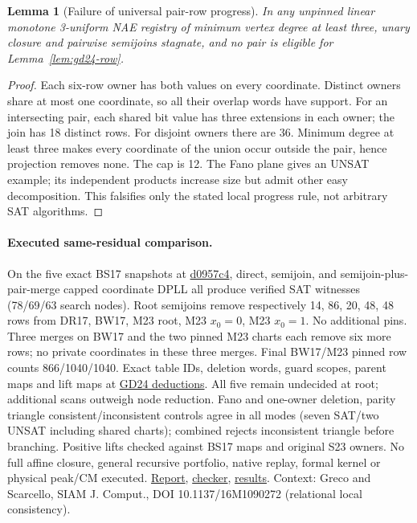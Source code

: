 \documentclass[11pt]{article}
\newtheorem{lemma}[theorem]{Lemma}
\begin{document}
\begin{lemma}[Failure of universal pair-row progress]\label{lem:gd24-stall}
In any unpinned linear monotone 3-uniform NAE registry of minimum vertex degree at least three, unary closure and pairwise semijoins stagnate, and no pair is eligible for Lemma~\ref{lem:gd24-row}.
\end{lemma}
\begin{proof}
Each six-row owner has both values on every coordinate. Distinct owners share at most one coordinate, so all their overlap words have support. For an intersecting pair, each shared bit value has three extensions in each owner; the join has 18 distinct rows. For disjoint owners there are 36. Minimum degree at least three makes every coordinate of the union occur outside the pair, hence projection removes none. The cap is 12. The Fano plane gives an UNSAT example; its independent products increase size but admit other easy decomposition. This falsifies only the stated local progress rule, not arbitrary SAT algorithms.
\end{proof}

\paragraph{Executed same-residual comparison.}
On the five exact BS17 snapshots at \href{https://github.com/j15marti/pnp/commit/d0957c4e012049409c644b915f52c3483e7bee6d}{d0957c4}, direct, semijoin, and semijoin-plus-pair-merge capped coordinate DPLL all produce verified SAT witnesses (78/69/63 search nodes). Root semijoins remove respectively 14, 86, 20, 48, 48 rows from DR17, BW17, M23 root, M23 $x_0=0$, M23 $x_0=1$. No additional pins. Three merges on BW17 and the two pinned M23 charts each remove six more rows; no private coordinates in these three merges. Final BW17/M23 pinned row counts 866/1040/1040. Exact table IDs, deletion words, guard scopes, parent maps and lift maps at \href{https://github.com/j15marti/pnp/commit/a06b25dad6c0d06f689a201825e2d267269cf181}{GD24 deductions}. All five remain undecided at root; additional scans outweigh node reduction. Fano and one-owner deletion, parity triangle consistent/inconsistent controls agree in all modes (seven SAT/two UNSAT including shared charts); combined rejects inconsistent triangle before branching. Positive lifts checked against BS17 maps and original S23 owners. No full affine closure, general recursive portfolio, native replay, formal kernel or physical peak/CM executed. \href{https://github.com/j15marti/pnp/commit/3518a75faa99f52956f6caeb0119c666ea5282e5}{Report}, \href{https://github.com/j15marti/pnp/commit/cb612e8abf58fa1f7d0f3cadef21b268ead1666d}{checker}, \href{https://github.com/j15marti/pnp/commit/cc4e1cf465d95b0c2fced7f010ff1a6b7a485680}{results}. Context: Greco and Scarcello, SIAM J. Comput., DOI 10.1137/16M1090272 (relational local consistency).
\end{document}
